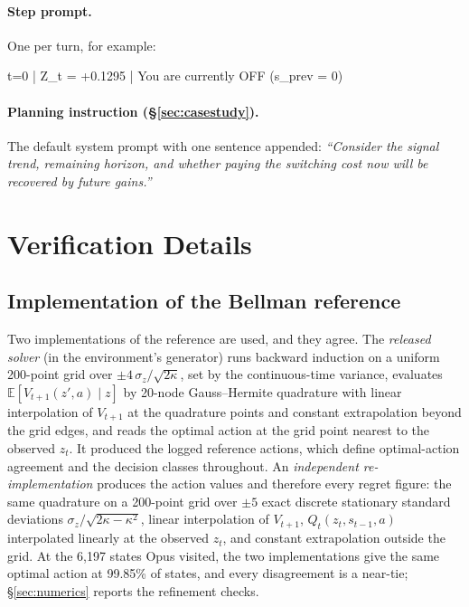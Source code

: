 \documentclass[10pt,a4paper,twocolumn]{article}
\newcommand{\sigz}{\sigma_z}
\begin{document}
\paragraph{Step prompt.} One per turn, for example:

\begin{cotbox}
t=0 | Z\_t = +0.1295 | You are currently OFF (s\_prev = 0)
\end{cotbox}

\paragraph{Planning instruction (\S\ref{sec:casestudy}).} The default system prompt with one sentence appended: \emph{``Consider the signal trend, remaining horizon, and whether paying the switching cost now will be recovered by future gains.''}

\section{Verification Details}\label{app:verify}

\subsection{Implementation of the Bellman reference}\label{app:verify-solver}
Two implementations of the reference are used, and they agree. The \emph{released solver} (in the environment's generator) runs backward induction on a uniform 200-point grid over $\pm4\,\sigz/\sqrt{2\kappa}$, set by the continuous-time variance, evaluates $\mathbb E[V_{t+1}(z',a)\mid z]$ by 20-node Gauss--Hermite quadrature with linear interpolation of $V_{t+1}$ at the quadrature points and constant extrapolation beyond the grid edges, and reads the optimal action at the grid point nearest to the observed $z_t$. It produced the logged reference actions, which define optimal-action agreement and the decision classes throughout. An \emph{independent re-implementation} produces the action values and therefore every regret figure: the same quadrature on a 200-point grid over $\pm5$ exact discrete stationary standard deviations $\sigz/\sqrt{2\kappa-\kappa^2}$, linear interpolation of $V_{t+1}$, $Q_t(z_t,s_{t-1},a)$ interpolated linearly at the observed $z_t$, and constant extrapolation outside the grid. At the 6{,}197 states Opus visited, the two implementations give the same optimal action at 99.85\% of states, and every disagreement is a near-tie; \S\ref{sec:numerics} reports the refinement checks.
\end{document}
